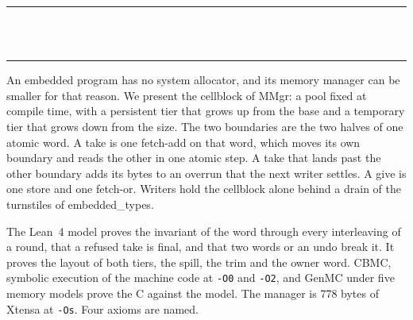 \thispagestyle{empty}
\begin{center}
  \rule{\textwidth}{0.4pt}\\[0.9em]
  {\Large{}}\\[0.7em]
  \rule{\textwidth}{0.4pt}
\end{center}
\bigskip

\noindent An embedded program has no system allocator, and its memory manager can be smaller for
that reason. We present the cellblock of MMgr: a pool fixed at compile time, with a persistent tier
that grows up from the base and a temporary tier that grows down from the size. The two boundaries
are the two halves of one atomic word. A take is one fetch-add on that word, which moves its own
boundary and reads the other in one atomic step. A take that lands past the other boundary adds its
bytes to an overrun that the next writer settles. A give is one store and one fetch-or. Writers hold
the cellblock alone behind a drain of the turnstiles of embedded\_types.

The Lean~4 model proves the invariant of the word through every interleaving of a round, that a
refused take is final, and that two words or an undo break it. It proves the layout of both tiers,
the spill, the trim and the owner word. CBMC, symbolic execution of the machine code at
\texttt{-O0} and \texttt{-O2}, and GenMC under five memory models prove the C against the model.
The manager is 778 bytes of Xtensa at \texttt{-Os}. Four axioms are named.
\cleardoublepage
